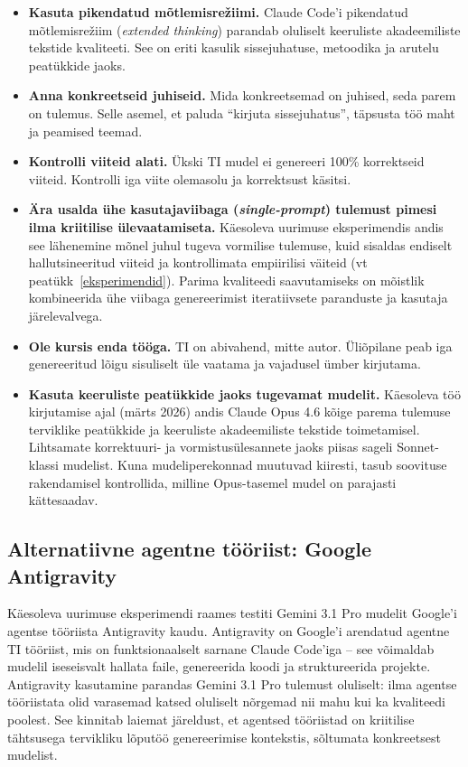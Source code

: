 \begin{itemize}
    \item \textbf{Kasuta pikendatud mõtlemisrežiimi.} Claude Code'i pikendatud mõtlemisrežiim (\textit{extended thinking}) parandab oluliselt keeruliste akadeemiliste tekstide kvaliteeti. See on eriti kasulik sissejuhatuse, metoodika ja arutelu peatükkide jaoks.
    \item \textbf{Anna konkreetseid juhiseid.} Mida konkreetsemad on juhised, seda parem on tulemus. Selle asemel, et paluda ``kirjuta sissejuhatus'', täpsusta töö maht ja peamised teemad.
    \item \textbf{Kontrolli viiteid alati.} Ükski TI mudel ei genereeri 100\% korrektseid viiteid. Kontrolli iga viite olemasolu ja korrektsust käsitsi.
    \item \textbf{Ära usalda ühe kasutajaviibaga (\textit{single-prompt}) tulemust pimesi ilma kriitilise ülevaatamiseta.} Käesoleva uurimuse eksperimendis andis see lähenemine mõnel juhul tugeva vormilise tulemuse, kuid sisaldas endiselt hallutsineeritud viiteid ja kontrollimata empiirilisi väiteid (vt peatükk~\ref{eksperimendid}). Parima kvaliteedi saavutamiseks on mõistlik kombineerida ühe viibaga genereerimist iteratiivsete paranduste ja kasutaja järelevalvega.
    \item \textbf{Ole kursis enda tööga.} TI on abivahend, mitte autor. Üliõpilane peab iga genereeritud lõigu sisuliselt üle vaatama ja vajadusel ümber kirjutama.
    \item \textbf{Kasuta keeruliste peatükkide jaoks tugevamat mudelit.} Käesoleva töö kirjutamise ajal (märts 2026) andis Claude Opus 4.6 kõige parema tulemuse terviklike peatükkide ja keeruliste akadeemiliste tekstide toimetamisel. Lihtsamate korrektuuri- ja vormistusülesannete jaoks piisas sageli Sonnet-klassi mudelist. Kuna mudeliperekonnad muutuvad kiiresti, tasub soovituse rakendamisel kontrollida, milline Opus-tasemel mudel on parajasti kättesaadav.
\end{itemize}

\subsection{Alternatiivne agentne tööriist: Google Antigravity} \label{subsec:antigravity}

Käesoleva uurimuse eksperimendi raames testiti Gemini 3.1 Pro mudelit Google'i agentse tööriista Antigravity kaudu. Antigravity on Google'i arendatud agentne TI tööriist, mis on funktsionaalselt sarnane Claude Code'iga -- see võimaldab mudelil iseseisvalt hallata faile, genereerida koodi ja struktureerida projekte. Antigravity kasutamine parandas Gemini 3.1 Pro tulemust oluliselt: ilma agentse tööriistata olid varasemad katsed oluliselt nõrgemad nii mahu kui ka kvaliteedi poolest. See kinnitab laiemat järeldust, et agentsed tööriistad on kriitilise tähtsusega tervikliku lõputöö genereerimise kontekstis, sõltumata konkreetsest mudelist.

